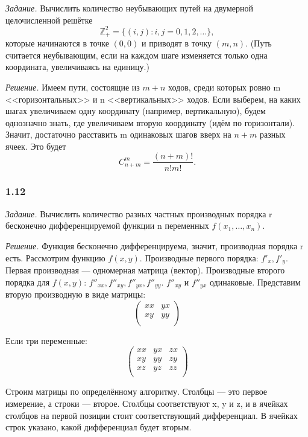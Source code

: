 \documentclass{book}
\begin{document}
\textit{Задание.} Вычислить количество неубывающих путей на двумерной целочисленной решётке $$\mathbb{Z}_+^2=\{\left(i, j\right): i, j=0, 1, 2,  \dotsc \},$$ которые начинаются в точке $\left(0, 0\right)$ и приводят в точку $\left(m, n\right)$. (Путь считается неубывающим, если на каждом шаге изменяется только одна координата, увеличиваясь на единицу.)

\textit{Решение.} Имеем пути, состоящие из $m+n$ ходов, среди которых ровно m <<горизонтальных>> и n <<вертикальных>> ходов. Если выберем, на каких шагах увеличиваем одну координату (например, вертикальную), будем однозначно знать, где увеличиваем вторую координату (идём по горизонтали). Значит, достаточно расставить m одинаковых шагов вверх на $n+m$ разных ячеек. Это будет $$C_{n+m}^m=\frac{\left(n+m\right)!}{n!m!}.$$

\subsubsection*{1.12}

\textit{Задание.} Вычислить количество разных частных производных порядка r бесконечно дифференцируемой функции n переменных $f\left(x_1,  \dotsc , x_n\right)$.

\textit{Решение.} Функция бесконечно дифференцируема, значит, производная порядка r есть. Рассмотрим функцию $f(x, y)$. Производные первого порядка: $f'_x, f'_y$. Первая производная --- одномерная матрица (вектор). Производные второго порядка для $f(x, y)$: $f''_{xx}, f''_{xy}, f''_{yx}, f''_{yy}$. $f''_{xy}$ и $f''_{yx}$ одинаковые. Представим вторую производную в виде матрицы:
$$
\begin{pmatrix}
  xx & yx \\
  xy & yy \\ 
\end{pmatrix}
$$

Если три переменные:
$$
\begin{pmatrix}
  xx & yx & zx \\
  xy & yy & zy \\
  xz & yz & zz \\ 
\end{pmatrix}
$$

Строим матрицы по определённому алгоритму. Столбцы --- это первое измерение, а строки --- второе. Столбцы соответствуют x, y и z, и в ячейках столбцов на первой позиции стоит соответствующий дифференциал. В ячейках строк указано, какой дифференциал будет вторым.
\end{document}

